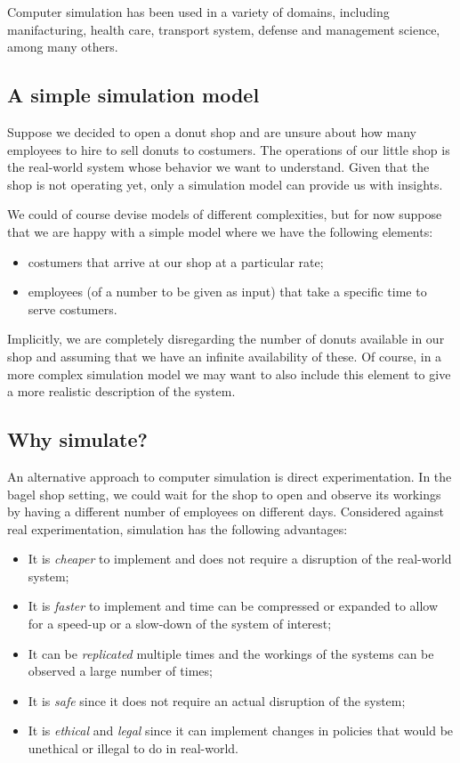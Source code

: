 \documentclass[
]{book}
\begin{document}
Computer simulation has been used in a variety of domains, including manifacturing, health care, transport system, defense and management science, among many others.

\hypertarget{a-simple-simulation-model}{%
\subsection{A simple simulation model}\label{a-simple-simulation-model}}

Suppose we decided to open a donut shop and are unsure about how many employees to hire to sell donuts to costumers. The operations of our little shop is the real-world system whose behavior we want to understand. Given that the shop is not operating yet, only a simulation model can provide us with insights.

We could of course devise models of different complexities, but for now suppose that we are happy with a simple model where we have the following elements:

\begin{itemize}
\item
  costumers that arrive at our shop at a particular rate;
\item
  employees (of a number to be given as input) that take a specific time to serve costumers.
\end{itemize}

Implicitly, we are completely disregarding the number of donuts available in our shop and assuming that we have an infinite availability of these. Of course, in a more complex simulation model we may want to also include this element to give a more realistic description of the system.

\hypertarget{why-simulate}{%
\subsection{Why simulate?}\label{why-simulate}}

An alternative approach to computer simulation is direct experimentation. In the bagel shop setting, we could wait for the shop to open and observe its workings by having a different number of employees on different days. Considered against real experimentation, simulation has the following advantages:

\begin{itemize}
\item
  It is \emph{cheaper} to implement and does not require a disruption of the real-world system;
\item
  It is \emph{faster} to implement and time can be compressed or expanded to allow for a speed-up or a slow-down of the system of interest;
\item
  It can be \emph{replicated} multiple times and the workings of the systems can be observed a large number of times;
\item
  It is \emph{safe} since it does not require an actual disruption of the system;
\item
  It is \emph{ethical} and \emph{legal} since it can implement changes in policies that would be unethical or illegal to do in real-world.
\end{itemize}
\end{document}
